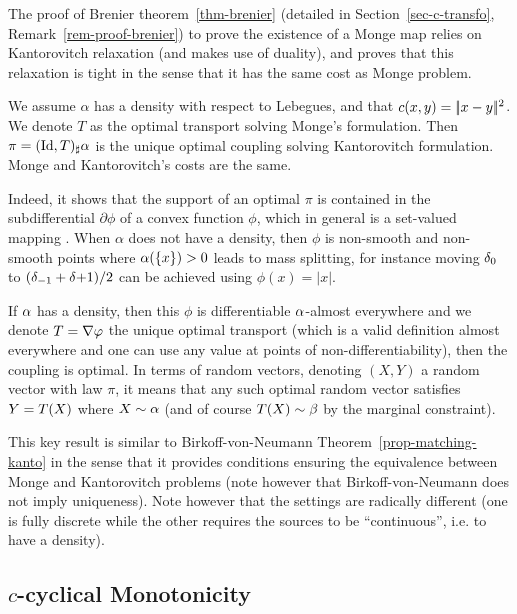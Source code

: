 The proof of Brenier theorem~\ref{thm-brenier}  (detailed in Section~\ref{sec-c-transfo}, Remark~\ref{rem-proof-brenier}) to prove the existence of a Monge map relies on Kantorovitch relaxation (and makes use of duality), and proves that this relaxation is tight in the sense that it has the same cost as Monge problem. 

\begin{cor}
	We assume $\alpha$ has a density with respect to Lebegues, and that $c(x,y)=|\!| x-y |\!|^2$. We denote $T$ as the optimal transport solving Monge's formulation. Then $\pi=(\mathrm{Id},T)_\sharp \alpha$ is the unique optimal coupling solving Kantorovitch formulation. Monge and Kantorovitch's costs are the same.
\end{cor}

Indeed, it shows that the support of an optimal $\pi$ is contained in the subdifferential $\partial \phi$ of a convex function $\phi$, which in general is a set-valued mapping .
%
When $\alpha$ does not have a density, then $\phi$ is non-smooth and non-smooth points where $\alpha(\{x\})>0$ leads to mass splitting, for instance moving $\delta_{0}$ to $(\delta_{-1}+\delta{+1})/2$ can be achieved using $\phi(x)=|x|$.  

If $\alpha$ has a density, then this $\phi$ is differentiable $\alpha$-almost everywhere and we denote $T=\nabla\varphi$ the unique optimal transport (which is a valid definition almost everywhere and one can use any value at points of non-differentiability), then the coupling 
is optimal. In terms of random vectors, denoting $(X,Y)$ a random vector with law $\pi$, it means that any such optimal random vector satisfies $Y=T(X)$ where $X \sim \alpha$ (and of course $T(X) \sim \beta$ by the marginal constraint). 

This key result is similar to Birkoff-von-Neumann Theorem~\ref{prop-matching-kanto} in the sense that it provides conditions ensuring the equivalence between Monge and Kantorovitch problems (note however that Birkoff-von-Neumann does not imply uniqueness). Note however that the settings are radically different (one is fully discrete while the other requires the sources to be ``continuous'', i.e. to have a density).


\subsection{$c$-cyclical Monotonicity}

